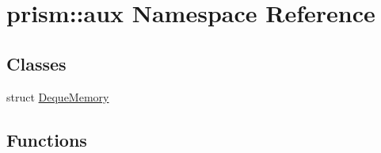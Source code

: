 \hypertarget{namespaceprism_1_1aux}{}\section{prism\+:\+:aux Namespace Reference}
\label{namespaceprism_1_1aux}
\subsection*{Classes}
\begin{DoxyCompactItemize}
\item 
struct \hyperlink{structprism_1_1aux_1_1_deque_memory}{Deque\+Memory}
\end{DoxyCompactItemize}
\subsection*{Functions}
